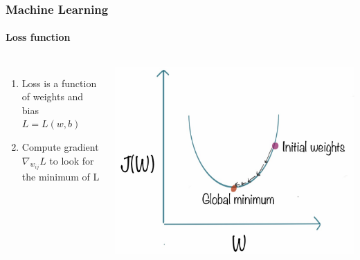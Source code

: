 \documentclass[aspectratio=43]{beamer}
\begin{document}
\begin{frame}

	\frametitle{Machine Learning}
	\framesubtitle{Loss function}

	\begin{columns}
		
		
		\begin{enumerate}
			\item Loss is a function of weights and bias $L = L(w, b)$
			\item Compute gradient $\nabla_{w_{ij}} L$ to look for the minimum of L
		\end{enumerate}
		
	
			\includegraphics[width = \linewidth]{plots/loss.png}
			
	\end{columns}

\end{frame}
\end{document}
